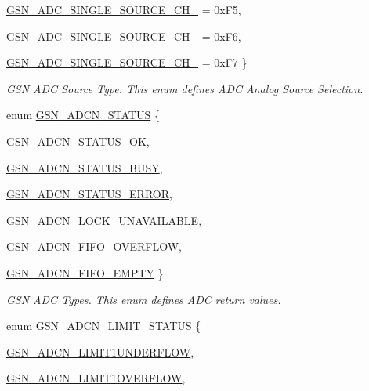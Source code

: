 \begin{DoxyCompactItemize}
\hyperlink{a00643_ggad3668c4c0f4514808fad4505e4f42900a664f1699626935ac95cb2d64f5aaeb4b}{GSN\_\-ADC\_\-SINGLE\_\-SOURCE\_\-CH\_} =  0xF5, 
\par
\hyperlink{a00643_ggad3668c4c0f4514808fad4505e4f42900a27306be8486f6001ccd2ee7a5af9dbc1}{GSN\_\-ADC\_\-SINGLE\_\-SOURCE\_\-CH\_} =  0xF6, 
\par
\hyperlink{a00643_ggad3668c4c0f4514808fad4505e4f42900a0da0c487fb87c351a41bcd520776ef94}{GSN\_\-ADC\_\-SINGLE\_\-SOURCE\_\-CH\_} =  0xF7
 \}
\begin{DoxyCompactList}\small\item\em GSN ADC Source Type. This enum defines ADC Analog Source Selection. \end{DoxyCompactList}\item 
enum \hyperlink{a00643_gaac5e6c70aa098ca208218da35914fa93}{GSN\_\-ADCN\_\-STATUS} \{ \par
\hyperlink{a00643_ggaac5e6c70aa098ca208218da35914fa93adbb40d9448e43738b36788b24f808126}{GSN\_\-ADCN\_\-STATUS\_\-OK}, 
\par
\hyperlink{a00643_ggaac5e6c70aa098ca208218da35914fa93a818eeb0196c46ccd15fd2466e33d72aa}{GSN\_\-ADCN\_\-STATUS\_\-BUSY}, 
\par
\hyperlink{a00643_ggaac5e6c70aa098ca208218da35914fa93a9825134b8cab6b2508116fc76d8427e8}{GSN\_\-ADCN\_\-STATUS\_\-ERROR}, 
\par
\hyperlink{a00643_ggaac5e6c70aa098ca208218da35914fa93a5395f0e21865dde1f046f32ae3193d0c}{GSN\_\-ADCN\_\-LOCK\_\-UNAVAILABLE}, 
\par
\hyperlink{a00643_ggaac5e6c70aa098ca208218da35914fa93a5768864cc8f5ad3f704d4c0b8b749730}{GSN\_\-ADCN\_\-FIFO\_\-OVERFLOW}, 
\par
\hyperlink{a00643_ggaac5e6c70aa098ca208218da35914fa93a9fe258a564ec0cde287fa9d878205dc5}{GSN\_\-ADCN\_\-FIFO\_\-EMPTY}
 \}
\begin{DoxyCompactList}\small\item\em GSN ADC Types. This enum defines ADC return values. \end{DoxyCompactList}\item 
enum \hyperlink{a00643_ga008458c1074bf0e3aace6adfc8a9a7d7}{GSN\_\-ADCN\_\-LIMIT\_\-STATUS} \{ \par
\hyperlink{a00643_gga008458c1074bf0e3aace6adfc8a9a7d7ac13b4f783887c707e52bcb6f0457686b}{GSN\_\-ADCN\_\-LIMIT1UNDERFLOW}, 
\par
\hyperlink{a00643_gga008458c1074bf0e3aace6adfc8a9a7d7aa577450c68918f0bbe5cc14ebc9e2fbc}{GSN\_\-ADCN\_\-LIMIT1OVERFLOW}, 

\end{DoxyCompactItemize}
